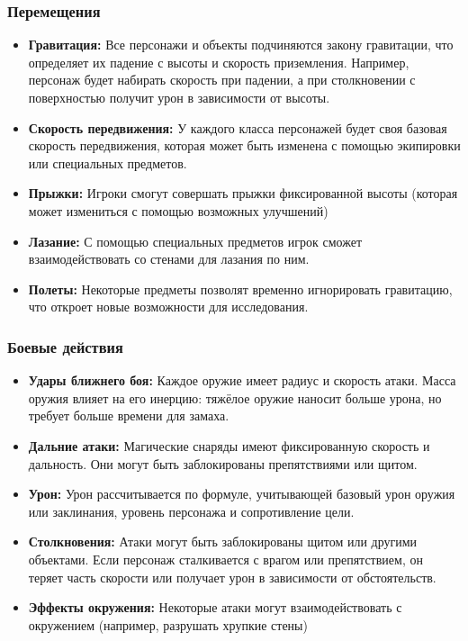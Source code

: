 \documentclass{article}
\begin{document}
\subsubsection{Перемещения}

\begin{itemize}
    \item \textbf{Гравитация:} Все персонажи и объекты подчиняются закону гравитации, что определяет их падение с высоты и скорость приземления. Например, персонаж будет набирать скорость при падении, а при столкновении с поверхностью получит урон в зависимости от высоты.
    \item \textbf{Скорость передвижения:} У каждого класса персонажей будет своя базовая скорость передвижения, которая может быть изменена с помощью экипировки или специальных предметов.
    \item \textbf{Прыжки:} Игроки смогут совершать прыжки фиксированной высоты (которая может измениться с помощью возможных улучшений)
    \item \textbf{Лазание:} С помощью специальных предметов игрок сможет взаимодействовать со стенами для лазания по ним.
    \item \textbf{Полеты:} Некоторые предметы позволят временно игнорировать гравитацию, что откроет новые возможности для исследования.
\end{itemize}

\subsubsection{Боевые действия}

\begin{itemize}
    \item \textbf{Удары ближнего боя:} Каждое оружие имеет радиус и скорость атаки. Масса оружия влияет на его инерцию: тяжёлое оружие наносит больше урона, но требует больше времени для замаха.
    \item \textbf{Дальние атаки:} Магические снаряды имеют фиксированную скорость и дальность. Они могут быть заблокированы препятствиями или щитом.
    \item \textbf{Урон:} Урон рассчитывается по формуле, учитывающей базовый урон оружия или заклинания, уровень персонажа и сопротивление цели.
    \item \textbf{Столкновения:} Атаки могут быть заблокированы щитом или другими объектами. Если персонаж сталкивается с врагом или препятствием, он теряет часть скорости или получает урон в зависимости от обстоятельств.
    \item \textbf{Эффекты окружения:} Некоторые атаки могут взаимодействовать с окружением (например, разрушать хрупкие стены)
\end{itemize}
\end{document}
